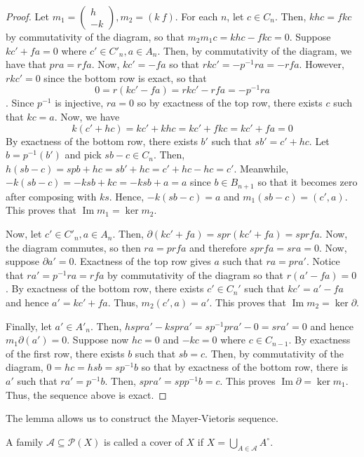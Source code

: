\documentclass[12pt,reqno]{amsart}
\numberwithin{theorem}{section}
\theoremstyle{definition}
\theoremstyle{remark}
\numberwithin{equation}{section}
\newcommand{\cA}{\mathcal{A}}
\newcommand{\im}{\operatorname{Im}}
\newcommand{\del}{\partial}
\theoremstyle{definition}
\begin{document}
\begin{proof}
Let $m_1 = \begin{pmatrix} h\\ -k\end{pmatrix},m_2 = (k \ f)$. For each $n$, let $c \in C_{n}$. Then, $khc = fkc$ by commutativity of the diagram, so that $m_2m_1c = khc - fkc = 0$. Suppose $kc'+fa = 0$ where $c' \in C'_{n}, a \in A_n$. Then, by commutativity of the diagram, we have that $pra = rfa$. Now, $kc' = -fa$ so that $rkc' = -p^{-1}ra = -rfa$. However, $rkc' = 0$ since the bottom row is exact, so that $$0 = r(kc'-fa) = rkc'-rfa = -p^{-1}ra$$. Since $p^{-1}$ is injective, $ra = 0$ so by exactness of the top row, there exists $c$ such that $kc = a$. Now, we have $$k(c' + hc) = kc' +khc = kc' +fkc =  kc'+fa = 0$$
By exactness of the bottom row, there exists $b'$ such that $sb' = c'+hc$. Let $b = p^{-1}(b')$ and pick $sb-c \in C_{n}$. Then, $h(sb-c) = spb +hc= sb' +hc= c'+hc -hc = c'$. Meanwhile, $-k(sb-c) = -ksb + kc = -ksb+a = a$ since $b \in B_{n+1}$ so that it becomes zero after composing with $ks$. Hence, $-k(sb -c)= a $ and $m_1(sb-c)=(c',a)$. This proves that $\im m_1 = \ker m_2$. 

Now, let $c' \in C'_{n}, a \in A_n$. Then, $\del (kc'+fa) = spr(kc'+fa) = sprfa $. Now, the diagram commutes, so then $ra = prfa$ and therefore $sprfa = sra = 0$. Now, suppose $\del a' = 0$. Exactness of the top row gives $a$ such that $ra = pra'$. Notice that $ra' = p^{-1}ra = rfa$ by commutativity of the diagram so that $r(a'-fa) = 0$. By exactness of the bottom row, there exists $c' \in C_{n}'$ such that $kc' = a'-fa$ and hence $a' = kc' + fa$. Thus, $m_2(c',a)=a'$. This proves that $\im m_2=\ker \del $.

Finally, let $a' \in A'_n$. Then, $hspra'-kspra' = sp^{-1}pra'-0=sra'=0$ and hence $m_1\del(a')=0$. Suppose now $hc= 0$ and $-kc = 0$ where $c \in C_{n-1}$. By exactness of the first row, there exists $b$ such that $sb =c$. Then, by commutativity of the diagram, $0=hc=hsb=sp^{-1}b $ so that by exactness of the bottom row, there is $a'$ such that $ra'=p^{-1}b$. Then, $spra' = spp^{-1}b = c$. This proves $\im \del =\ker m_1$. Thus, the sequence above is exact.
\end{proof}
The lemma allows us to construct the Mayer-Vietoris sequence.
\begin{definition}
    A family $\cA \subseteq \mathcal P (X)$ is called a cover of $X$ if $X=\bigcup_{A\in \cA} A^\circ$.
\end{definition}
\end{document}
